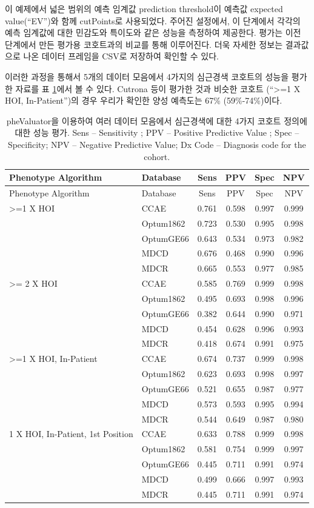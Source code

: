 \documentclass[10.5pt]{book}
\theoremstyle{definition}
\theoremstyle{definition}
\theoremstyle{definition}
\theoremstyle{remark}
\begin{document}
이 예제에서 넓은 범위의 예측 임계값 prediction threshold이 예측값
expected value(``EV'')와 함께 cutPoints로 사용되었다. 주어진 설정에서,
이 단계에서 각각의 예측 임계값에 대한 민감도와 특이도와 같은 성능을
측정하여 제공한다. 평가는 이전 단계에서 만든 평가용 코호트과의 비교를
통해 이루어진다. 더욱 자세한 정보는 결과값으로 나온 데이터 프레임을
CSV로 저장하여 확인할 수 있다.

이러한 과정을 통해서 5개의 데이터 모음에서 4가지의 심근경색 코호트의
성능을 평가한 자료를 표 \ref{tab:phevalStats}에서 볼 수 있다. Cutrona
등이 평가한 것과 비슷한 코호트 (``\textgreater{}=1 X HOI,
In-Patient'')의 경우 우리가 확인한 양성 예측도는 67\% (59\%-74\%)이다.

\begin{longtable}[]{@{}llcccc@{}}
\caption{\label{tab:phevalStats} pheValuator을 이용하여 여러 데이터 모음에서
심근경색에 대한 4가지 코호트 정의에 대한 성능 평가. Sens -- Sensitivity
; PPV -- Positive Predictive Value ; Spec -- Specificity; NPV --
Negative Predictive Value; Dx Code -- Diagnosis code for the
cohort.}\tabularnewline
\toprule
Phenotype Algorithm & Database & Sens & PPV & Spec & NPV\tabularnewline
\midrule
\endfirsthead
\toprule
Phenotype Algorithm & Database & Sens & PPV & Spec & NPV\tabularnewline
\midrule
\endhead
\textgreater{}=1 X HOI & CCAE & 0.761 & 0.598 & 0.997 &
0.999\tabularnewline
& Optum1862 & 0.723 & 0.530 & 0.995 & 0.998\tabularnewline
& OptumGE66 & 0.643 & 0.534 & 0.973 & 0.982\tabularnewline
& MDCD & 0.676 & 0.468 & 0.990 & 0.996\tabularnewline
& MDCR & 0.665 & 0.553 & 0.977 & 0.985\tabularnewline
\textgreater{}= 2 X HOI & CCAE & 0.585 & 0.769 & 0.999 &
0.998\tabularnewline
& Optum1862 & 0.495 & 0.693 & 0.998 & 0.996\tabularnewline
& OptumGE66 & 0.382 & 0.644 & 0.990 & 0.971\tabularnewline
& MDCD & 0.454 & 0.628 & 0.996 & 0.993\tabularnewline
& MDCR & 0.418 & 0.674 & 0.991 & 0.975\tabularnewline
\textgreater{}=1 X HOI, In-Patient & CCAE & 0.674 & 0.737 & 0.999 &
0.998\tabularnewline
& Optum1862 & 0.623 & 0.693 & 0.998 & 0.997\tabularnewline
& OptumGE66 & 0.521 & 0.655 & 0.987 & 0.977\tabularnewline
& MDCD & 0.573 & 0.593 & 0.995 & 0.994\tabularnewline
& MDCR & 0.544 & 0.649 & 0.987 & 0.980\tabularnewline
1 X HOI, In-Patient, 1st Position & CCAE & 0.633 & 0.788 & 0.999 &
0.998\tabularnewline
& Optum1862 & 0.581 & 0.754 & 0.999 & 0.997\tabularnewline
& OptumGE66 & 0.445 & 0.711 & 0.991 & 0.974\tabularnewline
& MDCD & 0.499 & 0.666 & 0.997 & 0.993\tabularnewline
& MDCR & 0.445 & 0.711 & 0.991 & 0.974\tabularnewline
\bottomrule
\end{longtable}
\end{document}
